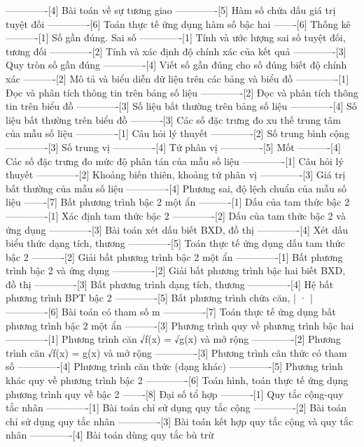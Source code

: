 -------------[4] Bài toán về sự tương giao
-------------[5] Hàm số chứa dấu giá trị tuyệt đối
-------------[6] Toán thực tế ứng dụng hàm số bậc hai
-------[6] Thống kê
----------[1] Số gần đúng. Sai số
-------------[1] Tính và ước lượng sai số tuyệt đối, tương đối
-------------[2] Tính và xác định độ chính xác của kết quả
-------------[3] Quy tròn số gần đúng
-------------[4] Viết số gần đúng cho số đúng biết độ chính xác
----------[2] Mô tả và biểu diễn dữ liệu trên các bảng và biểu đồ
-------------[1] Đọc và phân tích thông tin trên bảng số liệu
-------------[2] Đọc và phân tích thông tin trên biểu đồ
-------------[3] Số liệu bất thường trên bảng số liệu
-------------[4] Số liệu bất thường trên biểu đồ
----------[3] Các số đặc trưng đo xu thế trung tâm của mẫu số liệu
-------------[1] Câu hỏi lý thuyết
-------------[2] Số trung bình cộng
-------------[3] Số trung vị
-------------[4] Tứ phân vị
-------------[5] Mốt
----------[4] Các số đặc trưng đo mức độ phân tán của mẫu số liệu
-------------[1] Câu hỏi lý thuyết
-------------[2] Khoảng biến thiên, khoảng tứ phân vị
-------------[3] Giá trị bất thường của mẫu số liệu
-------------[4] Phương sai, độ lệch chuẩn của mẫu số liệu
-------[7] Bất phương trình bậc 2 một ẩn
----------[1] Dấu của tam thức bậc 2
-------------[1] Xác định tam thức bậc 2
-------------[2] Dấu của tam thức bậc 2 và ứng dụng
-------------[3] Bài toán xét dấu biết BXD, đồ thị
-------------[4] Xét dấu biểu thức dạng tích, thương
-------------[5] Toán thực tế ứng dụng dấu tam thức bậc 2
----------[2] Giải bất phương trình bậc 2 một ẩn
-------------[1] Bất phương trình bậc 2 và ứng dụng
-------------[2] Giải bất phương trình bậc hai biết BXD, đồ thị
-------------[3] Bất phương trình dạng tích, thương
-------------[4] Hệ bất phương trình BPT bậc 2
-------------[5] Bất phương trình chứa căn, | · |
-------------[6] Bài toán có tham số m
-------------[7] Toán thực tế ứng dụng bất phương trình bậc 2 một ẩn
----------[3] Phương trình quy về phương trình bậc hai
-------------[1] Phương trình căn √︀f(x) = √︀g(x) và mở rộng
-------------[2] Phương trình căn √︀f(x) = g(x) và mở rộng
-------------[3] Phương trình căn thức có tham số
-------------[4] Phương trình căn thức (dạng khác)
-------------[5] Phương trình khác quy về phương trình bậc 2
-------------[6] Toán hình, toán thực tế ứng dụng phương trình quy về bậc 2
-------[8] Đại số tổ hợp
----------[1] Quy tắc cộng-quy tắc nhân
-------------[1] Bài toán chỉ sử dụng quy tắc cộng
-------------[2] Bài toán chỉ sử dụng quy tắc nhân
-------------[3] Bài toán kết hợp quy tắc cộng và quy tắc nhân
-------------[4] Bài toán dùng quy tắc bù trừ
